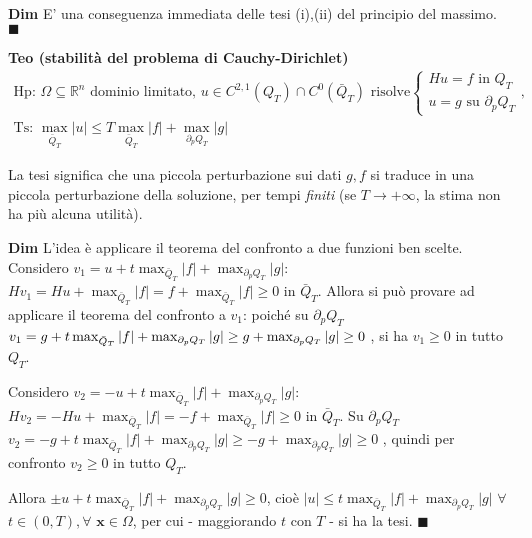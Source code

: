 \documentclass{article}
\begin{document}
\textbf{Dim} E' una conseguenza immediata delle tesi (i),(ii) del principio
del massimo. $\blacksquare $

\textbf{Teo (stabilit\`{a} del problema di Cauchy-Dirichlet)}%
\begin{gather*}
\text{Hp: }\Omega \subseteq 
\mathbb{R}
^{n}\text{ dominio limitato, }u\in C^{2,1}\left( Q_{T}\right) \cap
C^{0}\left( \bar{Q}_{T}\right) \text{ risolve}\left\{ 
\begin{array}{c}
Hu=f\text{ in }Q_{T} \\ 
u=g\text{ su }\partial _{p}Q_{T}%
\end{array}%
\right. \text{, } \\
\text{Ts: }\max_{\bar{Q}_{T}}\left\vert u\right\vert \leq T\max_{\bar{Q}%
_{T}}\left\vert f\right\vert +\max_{\partial _{p}Q_{T}}\left\vert
g\right\vert
\end{gather*}

La tesi significa che una piccola perturbazione sui dati $g,f$ si traduce in
una piccola perturbazione della soluzione, per tempi \textit{finiti} (se $%
T\rightarrow +\infty $, la stima non ha pi\`{u} alcuna utilit\`{a}).

\textbf{Dim} L'idea \`{e} applicare il teorema del confronto a due funzioni
ben scelte. Considero $v_{1}=u+t\max_{\bar{Q}_{T}}\left\vert f\right\vert
+\max_{\partial _{p}Q_{T}}\left\vert g\right\vert $: $Hv_{1}=Hu+\max_{\bar{Q}%
_{T}}\left\vert f\right\vert =f+\max_{\bar{Q}_{T}}\left\vert f\right\vert
\geq 0$ in $\bar{Q}_{T}$. Allora si pu\`{o} provare ad applicare il teorema
del confronto a $v_{1}$: poich\'{e} su $\partial _{p}Q_{T}$ $v_{1}=g+t\max_{%
\bar{Q}_{T}}\left\vert f\right\vert +\max_{\partial _{p}Q_{T}}\left\vert
g\right\vert \geq g+\max_{\partial _{p}Q_{T}}\left\vert g\right\vert \geq 0$%
, si ha $v_{1}\geq 0$ in tutto $Q_{T}$.

Considero $v_{2}=-u+t\max_{\bar{Q}_{T}}\left\vert f\right\vert
+\max_{\partial _{p}Q_{T}}\left\vert g\right\vert $: $Hv_{2}=-Hu+\max_{\bar{Q%
}_{T}}\left\vert f\right\vert =-f+\max_{\bar{Q}_{T}}\left\vert f\right\vert
\geq 0$ in $\bar{Q}_{T}$. Su $\partial _{p}Q_{T}$ $v_{2}=-g+t\max_{\bar{Q}%
_{T}}\left\vert f\right\vert +\max_{\partial _{p}Q_{T}}\left\vert
g\right\vert \geq -g+\max_{\partial _{p}Q_{T}}\left\vert g\right\vert \geq 0$%
, quindi per confronto $v_{2}\geq 0$ in tutto $Q_{T}$.

Allora $\pm u+t\max_{\bar{Q}_{T}}\left\vert f\right\vert +\max_{\partial
_{p}Q_{T}}\left\vert g\right\vert \geq 0$, cio\`{e} $\left\vert u\right\vert
\leq t\max_{\bar{Q}_{T}}\left\vert f\right\vert +\max_{\partial
_{p}Q_{T}}\left\vert g\right\vert $ $\forall $ $t\in \left( 0,T\right)
,\forall $ $\mathbf{x}\in \Omega $, per cui - maggiorando $t$ con $T$ - si
ha la tesi. $%
\blacksquare $
\end{document}
